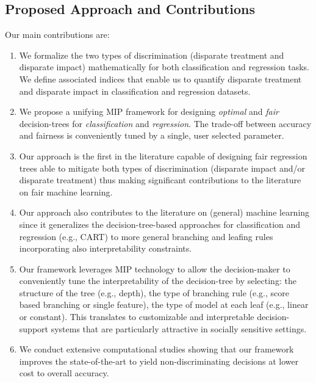 \documentclass[letterpaper]{article} %
\theoremstyle{definition}
\newcommand{\1}{\ensuremath{{\rm e}}} %
\begin{document}
\subsection{Proposed Approach and Contributions}

Our main contributions are:
\begin{enumerate}[(1)]
\item We formalize the two types of discrimination (disparate treatment and disparate impact) mathematically for both classification and regression tasks. We define associated indices that enable us to quantify disparate treatment and disparate impact in classification and regression datasets.
\item We propose a unifying MIP framework for designing \emph{optimal} and \emph{fair} decision-trees for \emph{classification} and \emph{regression}. The trade-off between accuracy and fairness is conveniently tuned by a single, user selected parameter. 
\item Our approach is the first in the literature capable of designing fair regression trees able to mitigate both types of discrimination (disparate impact and/or disparate treatment) thus making significant contributions to the literature on fair machine learning. 

\item  Our approach also contributes to the literature on (general) machine learning since it generalizes the decision-tree-based approaches for classification and regression (e.g., CART) to more general branching and leafing rules incorporating also interpretability constraints.

\item  Our framework leverages MIP technology to allow the decision-maker to conveniently tune the interpretability of the decision-tree by selecting: the structure of the tree (e.g., depth), the type of branching rule (e.g., score based branching or single feature), the type of model at each leaf (e.g., linear or constant). This translates to customizable and interpretable decision-support systems that are particularly attractive in socially sensitive settings.
\item We conduct extensive computational studies showing that our framework improves the state-of-the-art to yield non-discriminating decisions at lower cost to overall accuracy.
\end{enumerate}


\end{document}
